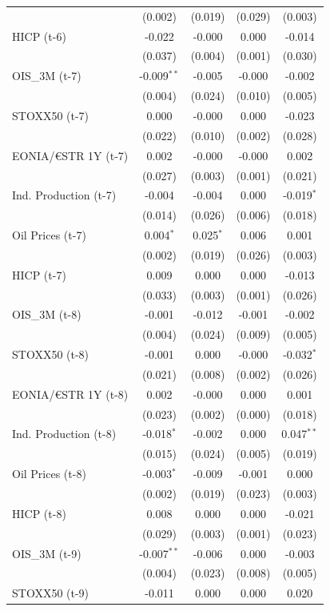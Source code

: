 \begin{longtable}[t]{lcccc}
 & (0.002) & (0.019) & (0.029) & (0.003)\\
HICP (t-6) & -0.022 & -0.000 & 0.000 & -0.014\\
 & (0.037) & (0.004) & (0.001) & (0.030)\\
OIS\_3M (t-7) & -0.009$^{**}$ & -0.005 & -0.000 & -0.002\\
 & (0.004) & (0.024) & (0.010) & (0.005)\\
STOXX50 (t-7) & 0.000 & -0.000 & 0.000 & -0.023\\
 & (0.022) & (0.010) & (0.002) & (0.028)\\
EONIA/€STR 1Y (t-7) & 0.002 & -0.000 & -0.000 & 0.002\\
 & (0.027) & (0.003) & (0.001) & (0.021)\\
Ind. Production (t-7) & -0.004 & -0.004 & 0.000 & -0.019$^{*}$\\
 & (0.014) & (0.026) & (0.006) & (0.018)\\
Oil Prices (t-7) & 0.004$^{*}$ & 0.025$^{*}$ & 0.006 & 0.001\\
 & (0.002) & (0.019) & (0.026) & (0.003)\\
HICP (t-7) & 0.009 & 0.000 & 0.000 & -0.013\\
 & (0.033) & (0.003) & (0.001) & (0.026)\\
OIS\_3M (t-8) & -0.001 & -0.012 & -0.001 & -0.002\\
 & (0.004) & (0.024) & (0.009) & (0.005)\\
STOXX50 (t-8) & -0.001 & 0.000 & -0.000 & -0.032$^{*}$\\
 & (0.021) & (0.008) & (0.002) & (0.026)\\
EONIA/€STR 1Y (t-8) & 0.002 & -0.000 & 0.000 & 0.001\\
 & (0.023) & (0.002) & (0.000) & (0.018)\\
Ind. Production (t-8) & -0.018$^{*}$ & -0.002 & 0.000 & 0.047$^{**}$\\
 & (0.015) & (0.024) & (0.005) & (0.019)\\
Oil Prices (t-8) & -0.003$^{*}$ & -0.009 & -0.001 & 0.000\\
 & (0.002) & (0.019) & (0.023) & (0.003)\\
HICP (t-8) & 0.008 & 0.000 & 0.000 & -0.021\\
 & (0.029) & (0.003) & (0.001) & (0.023)\\
OIS\_3M (t-9) & -0.007$^{**}$ & -0.006 & 0.000 & -0.003\\
 & (0.004) & (0.023) & (0.008) & (0.005)\\
STOXX50 (t-9) & -0.011 & 0.000 & 0.000 & 0.020\\

\end{longtable}
